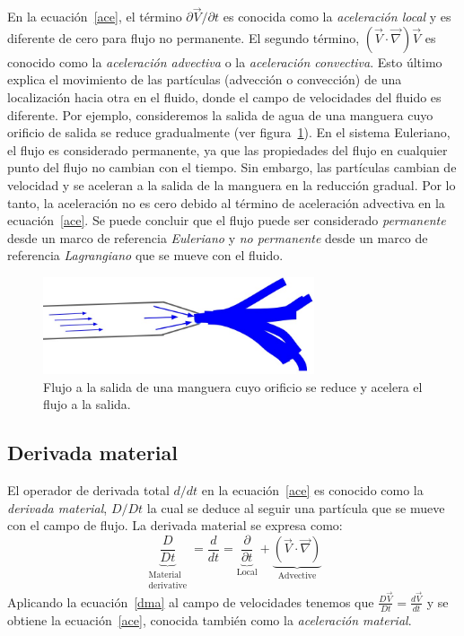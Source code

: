 \documentclass[10pt, oneside]{article}
\begin{document}
En la ecuación~\ref{ace}, el término $\partial \vec{V}/\partial t$ es conocida como la \emph{aceleración local} y es diferente de cero para flujo no permanente. El segundo término, $(\vec{V} \cdot \vec{\nabla})\vec{V}$ es conocido como la \emph{aceleración advectiva} o la \emph{aceleración convectiva}. Esto último explica el movimiento de las partículas (advección o convección) de una localización hacia otra en el fluido, donde el campo de velocidades del fluido es diferente. Por ejemplo, consideremos la salida de agua de una manguera cuyo orificio de salida se reduce gradualmente (ver figura~\ref{acel}). En el sistema Euleriano, el flujo es considerado permanente, ya que las propiedades del flujo en cualquier punto del flujo no cambian con el tiempo. Sin embargo, las partículas cambian de velocidad y se aceleran a la salida de la manguera en la reducción gradual. Por lo tanto, la aceleración no es cero debido al término de aceleración advectiva en la ecuación~\ref{ace}. Se puede concluir que el flujo puede ser considerado \emph{permanente} desde un marco de referencia \emph{Euleriano} y \emph{no permanente} desde un marco de referencia \emph{Lagrangiano} que se mueve con el fluido.

\begin{figure}[h]
\centering
\includegraphics[width=8cm]{Fig.2.jpg}
\caption{Flujo a la salida de una manguera cuyo orificio se reduce y acelera el flujo a la salida.}
\label{acel}
\end{figure}

\subsection{Derivada material}
El operador de derivada total $d/dt$ en la ecuación~\ref{ace} es conocido como la \emph{derivada material}, $D/Dt$ la cual se deduce al seguir una partícula que se mueve con el campo de flujo. La derivada material se expresa como:
\begin{equation}
\underbrace{\frac{D}{Dt}}_{\substack{\text{Material} \\ \text{derivative}}} = \frac{d}{dt} = \underbrace{\frac{\partial}{\partial t}}_{\text{Local}} + \underbrace{(\vec{V} \cdot \vec{\nabla})}_{\text{Advective}}
\label{dma}
\end{equation}
Aplicando la ecuación~\ref{dma} al campo de velocidades tenemos que $\frac{D\vec{V}}{Dt} = \frac{d\vec{V}}{dt}$ y se obtiene la ecuación~\ref{ace}, conocida también como la \emph{aceleración material}.
\end{document}
